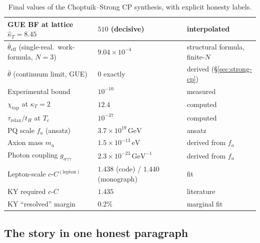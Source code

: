 \documentclass[11pt,a4paper]{article}
\newcommand{\cC}{c\text{-}C}
\theoremstyle{plain}
\theoremstyle{definition}
\theoremstyle{remark}
\begin{document}
\begin{table}[h]
\begin{tabular}{l l l}
GUE BF at lattice $\hat\kappa_T = 8.45$           & $510$ (decisive) & interpolated \\
\midrule
$\bar\theta_{\mathrm{eff}}$ (single-real.\ work-formula, $N=3$) & $9.04 \times 10^{-4}$ & structural formula, finite-$N$ \\
$\bar\theta$ (continuum limit, GUE)               & $0$ exactly & derived (\S\ref{sec:strong-cp}) \\
Experimental bound                                & $10^{-10}$ & measured \\
$\chi_{\mathrm{top}}$ at $\kappa_T=2$              & $12.4$ & computed \\
$\tau_{\mathrm{relax}}/t_H$ at $T_c$              & $10^{-37}$ & computed \\
\midrule
PQ scale $f_a$ (ansatz)                           & $3.7\times 10^{19}\,\mathrm{GeV}$ & ansatz \\
Axion mass $m_a$                                  & $1.5\times 10^{-13}\,\mathrm{eV}$ & derived from $f_a$ \\
Photon coupling $g_{a\gamma\gamma}$               & $2.3\times 10^{-23}\,\mathrm{GeV}^{-1}$ & derived from $f_a$ \\
\midrule
Lepton-scale $\cC^{\mathrm{(lepton)}}$            & $1.438$ (code) / $1.440$ (monograph) & fit \\
KY required $\cC$                                 & $1.435$ & literature \\
KY ``resolved'' margin                            & $0.2\%$ & marginal fit \\
\bottomrule
\end{tabular}
\caption{Final values of the Choptuik--Strong CP synthesis, with
explicit honesty labels.}
\label{tab:final}
\end{table}

\subsection{The story in one honest paragraph}
\end{document}
